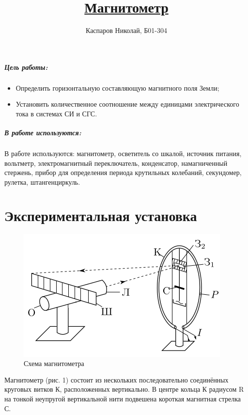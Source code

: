 \documentclass[a4paper]{article}
\title{\underline{Магнитометр}}
\author{Каспаров Николай, Б01-304}
\begin{document}
\maketitle
\begin{center}
\Large{\textbf{ }}
\end{center}

\subparagraph{Цель работы:}

\begin{itemize}
\item Определить горизонтальную составляющую магнитного поля Земли;
\item Установить количественное соотношение между единицами электрического тока в системах СИ и СГС.
\end{itemize}

\subparagraph{В работе используются:}

В работе используются: магнитометр, осветитель со шкалой, источник питания,
вольтметр, электромагнитный переключатель, конденсатор, намагниченный стержень,
прибор для определения периода крутильных колебаний,
секундомер, рулетка, штангенциркуль.

\section{Экспериментальная установка}

\begin{figure}[h!]
    \centering
    \includegraphics[width=0.5\pdfpagewidth]{shema.png}
    \caption{Схема магнитометра}
\end{figure}
Магнитометр (рис. 1) состоит из нескольких последовательно соединённых круговых витков К,
расположенных вертикально.
В центре кольца К радиусом R на тонкой неупругой вертикальной нити подвешена короткая магнитная стрелка С.
\end{document}
